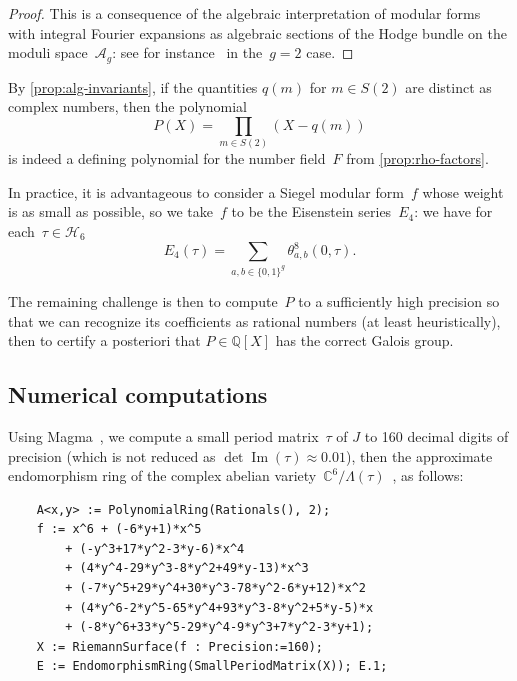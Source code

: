 \documentclass[12pt,oneside]{amsart}
\numberwithin{equation}{section}
\theoremstyle{definition}
\newcommand{\Q}{\mathbb{Q}}
\newcommand{\C}{\mathbb{C}}
\newcommand{\Half}{\mathcal{H}}
\DeclareMathOperator{\im}{Im}
\begin{document}
\begin{proof}
  This is a consequence of the algebraic interpretation of modular forms with
  integral Fourier expansions as algebraic sections of the Hodge bundle on the
  moduli space~$\mathcal{A}_g$: see for
  instance~\cite[Thm.~4.11]{vanbommelComputingIsogenyClasses2024} in the~$g=2$
  case.
\end{proof}


By \cref{prop:alg-invariants}, if the quantities $q(m)$ for $m\in S(2)$ are
distinct as complex numbers, then the polynomial
\begin{equation}
  \label{eq:P}
  P(X) = \prod_{m\in S(2)}(X - q(m))
\end{equation}
is indeed a defining polynomial for the number field~$F$ from
\cref{prop:rho-factors}.


In practice, it is advantageous to consider a Siegel modular form~$f$ whose
weight is as small as possible, so we take~$f$ to be the Eisenstein
series~$E_4$: we have for each~$\tau\in \Half_6$
\begin{equation}
  E_4(\tau) = \sum_{a,b\in \{0,1\}^g} \theta_{a,b}^8(0,\tau).
\end{equation}

The remaining challenge is then to compute~$P$ to a sufficiently high precision
so that we can recognize its coefficients as rational numbers (at least
heuristically), then to certify a posteriori that $P\in \Q[X]$ has the correct
Galois group.

\subsection{Numerical computations}
\label{subsec:galois-compute}

Using Magma~\cite{bosmaMagmaAlgebraSystem1997}, we compute a small period
matrix~$\tau$ of $J$ to 160 decimal digits of precision (which is not reduced
as $\det\im(\tau)\approx 0.01$), then the approximate endomorphism ring of the
complex abelian
variety~$\C^6/\Lambda(\tau)$~\cite{costaRigorousComputationEndomorphism2019},
as follows:
\begin{center}
\begin{verbatim}
    A<x,y> := PolynomialRing(Rationals(), 2);
    f := x^6 + (-6*y+1)*x^5
        + (-y^3+17*y^2-3*y-6)*x^4
        + (4*y^4-29*y^3-8*y^2+49*y-13)*x^3
        + (-7*y^5+29*y^4+30*y^3-78*y^2-6*y+12)*x^2
        + (4*y^6-2*y^5-65*y^4+93*y^3-8*y^2+5*y-5)*x
        + (-8*y^6+33*y^5-29*y^4-9*y^3+7*y^2-3*y+1);
    X := RiemannSurface(f : Precision:=160);
    E := EndomorphismRing(SmallPeriodMatrix(X)); E.1;
\end{verbatim}
\end{center}
\end{document}
